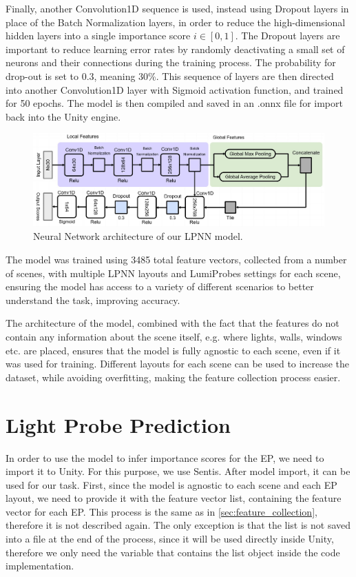 Finally, another Convolution1D sequence is used, instead using Dropout layers in place of the Batch Normalization layers, in order to reduce the high-dimensional hidden layers into a single importance score $i \in [0,1]$. The Dropout layers are important to reduce learning error rates by randomly deactivating a small set of neurons and their connections during the training process. The probability for drop-out is set to 0.3, meaning 30\%. This sequence of layers are then directed into another Convolution1D layer with Sigmoid activation function, and trained for 50 epochs. The model is then compiled and saved in an .onnx file for import back into the Unity engine.

\begin{figure}[h]
	\centering
	\includegraphics[width=\linewidth]{Graphics/LPNN.jpg}
	\caption{Neural Network architecture of our LPNN model.}
	\label{fig:LPNN_arch}
\end{figure}

The model was trained using 3485 total feature vectors, collected from a number of scenes, with multiple LPNN layouts and LumiProbes settings for each scene, ensuring the model has access to a variety of different scenarios to better understand the task, improving accuracy.\newline

The architecture of the model, combined with the fact that the features do not contain any information about the scene itself, e.g. where lights, walls, windows etc. are placed, ensures that the model is fully agnostic to each scene, even if it was used for training. Different layouts for each scene can be used to increase the dataset, while avoiding overfitting, making the feature collection process easier.

\section{Light Probe Prediction}
\label{sec:lp_predict}
In order to use the model to infer importance scores for the EP, we need to import it to Unity. For this purpose, we use Sentis. After model import, it can be used for our task. First, since the model is agnostic to each scene and each EP layout, we need to provide it with the feature vector list, containing the feature vector for each EP. This process is the same as in \ref{sec:feature_collection}, therefore it is not described again. The only exception is that the list is not saved into a file at the end of the process, since it will be used directly inside Unity, therefore we only need the variable that contains the list object inside the code implementation.


